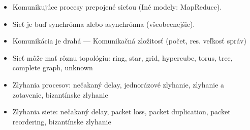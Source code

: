\documentclass[paper=a4, fontsize=11pt]{scrartcl} %
\numberwithin{equation}{section} %
\numberwithin{figure}{section} %
\numberwithin{table}{section} %
\begin{document}
\begin{itemize}
	\item Komunikujúce procesy prepojené sieťou (Iné modely: MapReduce).
	
	\item Sieť je buď synchrónna alebo asynchrónna (všeobecnejšie).
	
	\item Komunikácia je drahá — Komunikačná zložitosť (počet, res. veľkosť správ)
	
	\item Sieť môže mať rôznu topológiu: ring, star, grid, hypercube, torus, tree, complete graph, unknown
	
	\item Zlyhania procesov: nečakaný delay, jednorázové zlyhanie, zlyhanie a zotavenie, bizantínske zlyhanie
	
	\item Zlyhania siete: nečakaný delay, packet loss, packet duplication, packet reordering, bizantínske zlyhanie

\end{itemize}
	
	
	
\end{document}
